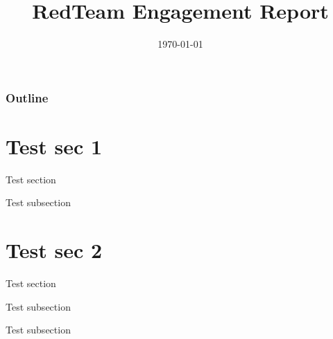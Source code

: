 \documentclass{rtPresentation}
\title{RedTeam Engagement Report}
\author{\getenv{AUTHOR}}
\date{\today}
\begin{document}
\begin{frame}
    \titlepage
\end{frame}

\begin{frame}
    \frametitle{Outline}
    \tableofcontents
\end{frame}

\section{Test sec 1}

\begin{frame}

Test section
\end{frame}


\begin{frame}

Test subsection
\end{frame}

\section{Test sec 2}
\begin{frame}
    Test section

\end{frame}


\begin{frame}
Test subsection
\end{frame}

\begin{frame}
Test subsection
\end{frame}
\end{document}
